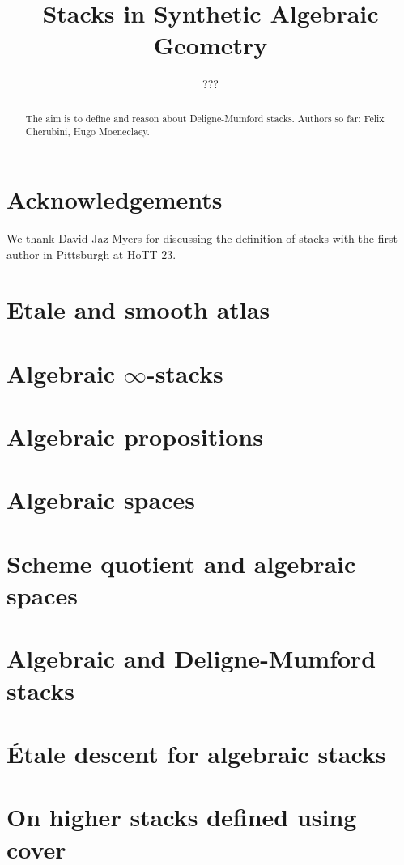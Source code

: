 \documentclass{../util/zariski}
\title{Stacks in Synthetic Algebraic Geometry}
\author{???}
\begin{document}
\maketitle

\begin{abstract}
  The aim is to define and reason about Deligne-Mumford stacks.
  Authors so far: Felix Cherubini, Hugo Moeneclaey.
\end{abstract}

\section*{Acknowledgements}
We thank David Jaz Myers for discussing the definition of stacks with the first author in Pittsburgh at HoTT 23.

\tableofcontents

\section{Etale and smooth atlas}


\section{Algebraic $\infty$-stacks}


\section{Algebraic propositions}


\section{Algebraic spaces}


\section{Scheme quotient and algebraic spaces}


\section{Algebraic and Deligne-Mumford stacks}


\section{Étale descent for algebraic stacks}


\section{On higher stacks defined using cover}



\printindex

\printbibliography
\end{document}
